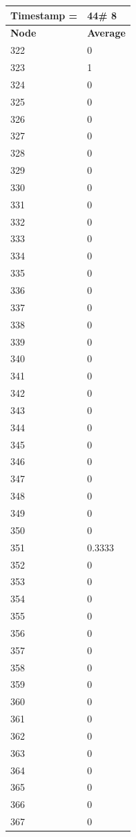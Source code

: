 \begin{tabular}{|l||l|}
\hline
\textbf{Timestamp =} & \textbf{44}\# 8\\\hline
	\textbf{Node} & \textbf{Average} \\ \hline
\hline
	322 & 0 \\ \hline
	323 & 1 \\ \hline
	324 & 0 \\ \hline
	325 & 0 \\ \hline
	326 & 0 \\ \hline
	327 & 0 \\ \hline
	328 & 0 \\ \hline
	329 & 0 \\ \hline
	330 & 0 \\ \hline
	331 & 0 \\ \hline
	332 & 0 \\ \hline
	333 & 0 \\ \hline
	334 & 0 \\ \hline
	335 & 0 \\ \hline
	336 & 0 \\ \hline
	337 & 0 \\ \hline
	338 & 0 \\ \hline
	339 & 0 \\ \hline
	340 & 0 \\ \hline
	341 & 0 \\ \hline
	342 & 0 \\ \hline
	343 & 0 \\ \hline
	344 & 0 \\ \hline
	345 & 0 \\ \hline
	346 & 0 \\ \hline
	347 & 0 \\ \hline
	348 & 0 \\ \hline
	349 & 0 \\ \hline
	350 & 0 \\ \hline
	351 & 0.3333 \\ \hline
	352 & 0 \\ \hline
	353 & 0 \\ \hline
	354 & 0 \\ \hline
	355 & 0 \\ \hline
	356 & 0 \\ \hline
	357 & 0 \\ \hline
	358 & 0 \\ \hline
	359 & 0 \\ \hline
	360 & 0 \\ \hline
	361 & 0 \\ \hline
	362 & 0 \\ \hline
	363 & 0 \\ \hline
	364 & 0 \\ \hline
	365 & 0 \\ \hline
	366 & 0 \\ \hline
	367 & 0 \\ \hline
\end{tabular}

